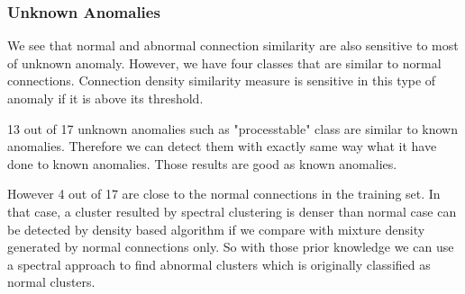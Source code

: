 \subsubsection{Unknown Anomalies}
We see that normal and abnormal connection similarity are also sensitive to most of unknown anomaly. 
However, we have four classes that are similar to normal connections. 
Connection density similarity measure is sensitive in this type of anomaly if it is above its threshold. 

13 out of 17 unknown anomalies such as "processtable" class are similar to known anomalies. 
Therefore we can detect them with exactly same way what it have done to known anomalies. 
Those results are good as known anomalies. 

\begin{table}[h]
\begin{center}
\end{center}
\caption{Unknown anomalies that is similar to the known anomalies detection rate}
\label{fig:refSingleRobot1}
\end{table}

However 4 out of 17 are close to the normal connections in the training set. 
In that case, a cluster resulted by spectral clustering is denser than normal case can be detected by density based algorithm if we compare with mixture density generated by normal connections only. 
So with those prior knowledge we can use a spectral approach to find abnormal clusters which is originally classified as normal clusters. 

